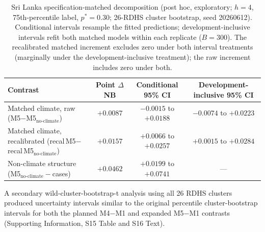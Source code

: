 \documentclass[11pt,a4paper]{article}
\begin{document}
\begin{table}[htbp]
\centering
\caption{Sri Lanka specification-matched decomposition (post hoc, exploratory; $h=4$, 75th-percentile label, $p^*=0.30$; 26-RDHS cluster bootstrap, seed 20260612). Conditional intervals resample the fitted predictions; development-inclusive intervals refit both matched models within each replicate ($B=300$). The recalibrated matched increment excludes zero under both interval treatments (marginally under the development-inclusive treatment); the raw increment includes zero under both.}
\label{tab:slmatched}
\footnotesize{}
\begin{tabular}{@{}lccc@{}}
\toprule
Contrast & Point $\Delta$NB & Conditional 95\% CI & Development-inclusive 95\% CI \\
\midrule
Matched climate, raw (M5$-$M5$_{\text{no-climate}}$) & $+0.0087$ & $-0.0015$ to $+0.0188$ & $-0.0074$ to $+0.0223$ \\
Matched climate, recalibrated (recal\,M5$-$recal\,M5$_{\text{no-climate}}$) & $+0.0157$ & $+0.0066$ to $+0.0257$ & $+0.0015$ to $+0.0284$ \\
Non-climate structure (M5$_{\text{no-climate}}-$cases) & $+0.0462$ & $+0.0199$ to $+0.0741$ & --- \\
\bottomrule
\end{tabular}
\end{table} A secondary wild-cluster-bootstrap-t analysis using all 26 RDHS clusters produced uncertainty intervals similar to the original percentile cluster-bootstrap intervals for both the planned M4$-$M1 and expanded M5$-$M1 contrasts (Supporting Information, S15 Table and S16 Text).
\end{document}
